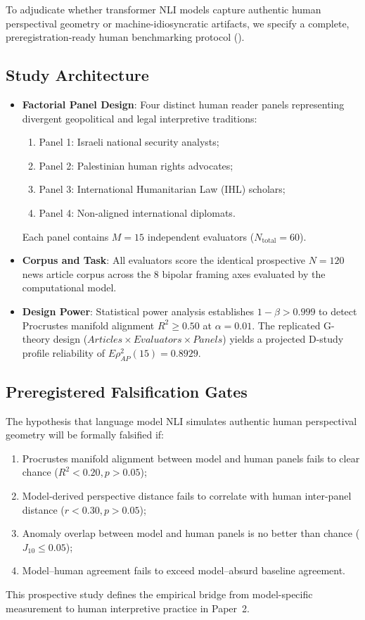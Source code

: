 To adjudicate whether transformer NLI models capture authentic human perspectival geometry or machine-idiosyncratic artifacts, we specify a complete, preregistration-ready human benchmarking protocol ().

\subsection{Study Architecture}
\begin{itemize}
    \item \textbf{Factorial Panel Design}: Four distinct human reader panels representing divergent geopolitical and legal interpretive traditions:
    \begin{enumerate}
        \item Panel 1: Israeli national security analysts;
        \item Panel 2: Palestinian human rights advocates;
        \item Panel 3: International Humanitarian Law (IHL) scholars;
        \item Panel 4: Non-aligned international diplomats.
    \end{enumerate}
    Each panel contains $M=15$ independent evaluators ($N_{\text{total}} = 60$).
    \item \textbf{Corpus and Task}: All evaluators score the identical prospective $N=120$ news article corpus across the 8 bipolar framing axes evaluated by the computational model.
    \item \textbf{Design Power}: Statistical power analysis establishes $1 - \beta > 0.999$ to detect Procrustes manifold alignment $R^2 \ge 0.50$ at $\alpha = 0.01$. The replicated G-theory design ($Articles \times Evaluators \times Panels$) yields a projected D-study profile reliability of $E\rho^2_{AP}(15) = \mathbf{0.8929}$.
\end{itemize}

\subsection{Preregistered Falsification Gates}
The hypothesis that language model NLI simulates authentic human perspectival geometry will be formally falsified if:
\begin{enumerate}
    \item Procrustes manifold alignment between model and human panels fails to clear chance ($R^2 < 0.20, p > 0.05$);
    \item Model-derived perspective distance fails to correlate with human inter-panel distance ($r < 0.30, p > 0.05$);
    \item Anomaly overlap between model and human panels is no better than chance ($J_{10} \le 0.05$);
    \item Model--human agreement fails to exceed model--absurd baseline agreement.
\end{enumerate}
This prospective study defines the empirical bridge from model-specific measurement to human interpretive practice in Paper~2.
